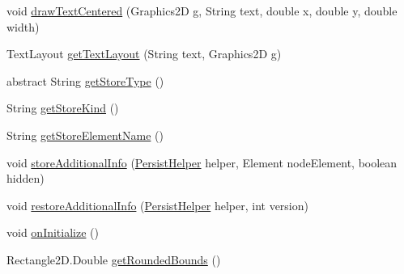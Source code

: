 \begin{DoxyCompactItemize}
\item 
void \hyperlink{classorg_1_1tzi_1_1use_1_1gui_1_1views_1_1diagrams_1_1elements_1_1_placeable_node_ab1493a0f951e4a005e45f885755bfa96}{draw\-Text\-Centered} (Graphics2\-D g, String text, double x, double y, double width)
\item 
Text\-Layout \hyperlink{classorg_1_1tzi_1_1use_1_1gui_1_1views_1_1diagrams_1_1elements_1_1_placeable_node_afe88770772959e77fff1e53d43d99802}{get\-Text\-Layout} (String text, Graphics2\-D g)
\item 
abstract String \hyperlink{classorg_1_1tzi_1_1use_1_1gui_1_1views_1_1diagrams_1_1elements_1_1_placeable_node_a10323cd59e4715226ceaccb7193371d1}{get\-Store\-Type} ()
\item 
String \hyperlink{classorg_1_1tzi_1_1use_1_1gui_1_1views_1_1diagrams_1_1elements_1_1_placeable_node_a1ab72bf7bae3be7992730e675c903b64}{get\-Store\-Kind} ()
\item 
String \hyperlink{classorg_1_1tzi_1_1use_1_1gui_1_1views_1_1diagrams_1_1elements_1_1_placeable_node_ab41f82b0a5a2939e54573f565d04160d}{get\-Store\-Element\-Name} ()
\item 
void \hyperlink{classorg_1_1tzi_1_1use_1_1gui_1_1views_1_1diagrams_1_1elements_1_1_placeable_node_a72c6bd342a6225e3d138bc27b4fb31d9}{store\-Additional\-Info} (\hyperlink{classorg_1_1tzi_1_1use_1_1gui_1_1util_1_1_persist_helper}{Persist\-Helper} helper, Element node\-Element, boolean hidden)
\item 
void \hyperlink{classorg_1_1tzi_1_1use_1_1gui_1_1views_1_1diagrams_1_1elements_1_1_placeable_node_a79ee7db5fa0738512c0208aa59d6e303}{restore\-Additional\-Info} (\hyperlink{classorg_1_1tzi_1_1use_1_1gui_1_1util_1_1_persist_helper}{Persist\-Helper} helper, int version)
\item 
void \hyperlink{classorg_1_1tzi_1_1use_1_1gui_1_1views_1_1diagrams_1_1elements_1_1_placeable_node_a81da3c0a1e4936d489b839a2c37c4a4e}{on\-Initialize} ()
\item 
Rectangle2\-D.\-Double \hyperlink{classorg_1_1tzi_1_1use_1_1gui_1_1views_1_1diagrams_1_1elements_1_1_placeable_node_a9712c5e2196df5825055a268e3fbc9ca}{get\-Rounded\-Bounds} ()
\end{DoxyCompactItemize}
